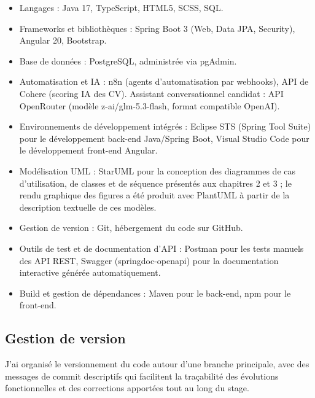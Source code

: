 \begin{itemize}
\item Langages : Java 17, TypeScript, HTML5, SCSS, SQL.
\item Frameworks et bibliothèques : Spring Boot 3 (Web, Data JPA, Security), Angular 20, Bootstrap.
\item Base de données : PostgreSQL, administrée via pgAdmin.
\item Automatisation et IA : n8n (agents d’automatisation par webhooks), API de Cohere (scoring IA des CV). Assistant conversationnel candidat : API OpenRouter (modèle z-ai/glm-5.3-flash, format compatible OpenAI).
\item Environnements de développement intégrés : Eclipse STS (Spring Tool Suite) pour le développement back-end Java/Spring Boot, Visual Studio Code pour le développement front-end Angular.
\item Modélisation UML : StarUML pour la conception des diagrammes de cas d’utilisation, de classes et de séquence présentés aux chapitres 2 et 3 ; le rendu graphique des figures a été produit avec PlantUML à partir de la description textuelle de ces modèles.
\item Gestion de version : Git, hébergement du code sur GitHub.
\item Outils de test et de documentation d’API : Postman pour les tests manuels des API REST, Swagger (springdoc-openapi) pour la documentation interactive générée automatiquement.
\item Build et gestion de dépendances : Maven pour le back-end, npm pour le front-end.
\end{itemize}

\subsection{Gestion de version}
\label{sec_4_2_3}
J’ai organisé le versionnement du code autour d’une branche principale, avec des messages de commit descriptifs qui facilitent la traçabilité des évolutions fonctionnelles et des corrections apportées tout au long du stage.

